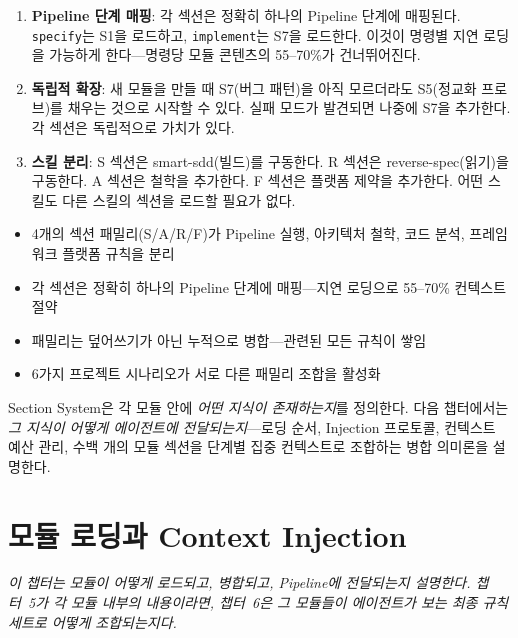 \documentclass[11pt,a4paper,openright,twoside]{report}
\begin{document}
\begin{enumerate}
  \item \textbf{Pipeline 단계 매핑}: 각 섹션은 정확히 하나의 Pipeline 단계에 매핑된다. \texttt{specify}는 S1을 로드하고, \texttt{implement}는 S7을 로드한다. 이것이 명령별 지연 로딩을 가능하게 한다---명령당 모듈 콘텐츠의 55--70\%가 건너뛰어진다.
  \item \textbf{독립적 확장}: 새 모듈을 만들 때 S7(버그 패턴)을 아직 모르더라도 S5(정교화 프로브)를 채우는 것으로 시작할 수 있다. 실패 모드가 발견되면 나중에 S7을 추가한다. 각 섹션은 독립적으로 가치가 있다.
  \item \textbf{스킬 분리}: S 섹션은 smart-sdd(빌드)를 구동한다. R 섹션은 reverse-spec(읽기)을 구동한다. A 섹션은 철학을 추가한다. F 섹션은 플랫폼 제약을 추가한다. 어떤 스킬도 다른 스킬의 섹션을 로드할 필요가 없다.
\end{enumerate}

\begin{tipbox}[챕터 5 핵심 요약]
\begin{itemize}[nosep]
  \item 4개의 섹션 패밀리(S/A/R/F)가 Pipeline 실행, 아키텍처 철학, 코드 분석, 프레임워크 플랫폼 규칙을 분리
  \item 각 섹션은 정확히 하나의 Pipeline 단계에 매핑---지연 로딩으로 55--70\% 컨텍스트 절약
  \item 패밀리는 덮어쓰기가 아닌 누적으로 병합---관련된 모든 규칙이 쌓임
  \item 6가지 프로젝트 시나리오가 서로 다른 패밀리 조합을 활성화
\end{itemize}
\end{tipbox}

Section System은 각 모듈 안에 \emph{어떤 지식이 존재하는지}를 정의한다. 다음 챕터에서는 \emph{그 지식이 어떻게 에이전트에 전달되는지}---로딩 순서, Injection 프로토콜, 컨텍스트 예산 관리, 수백 개의 모듈 섹션을 단계별 집중 컨텍스트로 조합하는 병합 의미론을 설명한다.

\chapter{모듈 로딩과 Context Injection}
\label{ch:injection}

\textit{이 챕터는 모듈이 어떻게 로드되고, 병합되고, Pipeline에 전달되는지 설명한다. 챕터~5가 각 모듈 내부의 내용이라면, 챕터~6은 그 모듈들이 에이전트가 보는 최종 규칙 세트로 어떻게 조합되는지다.}
\end{document}
